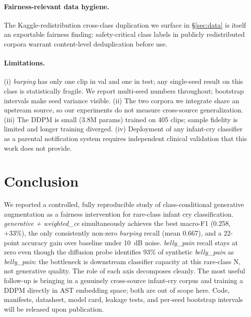 \documentclass[pmlr,twocolumn,10pt]{jmlr}
\begin{document}
\paragraph{Fairness-relevant data hygiene.} The Kaggle-redistribution cross-class duplication we surface in \S\ref{sec:data} is itself an exportable fairness finding: safety-critical class labels in publicly redistributed corpora warrant content-level deduplication before use.

\paragraph{Limitations.}
(i) \textit{burping} has only one clip in val and one in test; any single-seed result on this class is statistically fragile. We report multi-seed numbers throughout; bootstrap intervals make seed variance visible.
(ii) The two corpora we integrate share an upstream source, so our experiments do not measure cross-source generalization.
(iii) The DDPM is small (3.8M params) trained on 405 clips; sample fidelity is limited and longer training diverged.
(iv) Deployment of any infant-cry classifier as a parental notification system requires independent clinical validation that this work does not provide.

\section{Conclusion}\label{sec:concl}
We reported a controlled, fully reproducible study of class-conditional generative augmentation as a fairness intervention for rare-class infant cry classification. \textit{generative + weighted\_ce} simultaneously achieves the best macro-F1 (0.258, $+33\%$), the only consistently non-zero \textit{burping} recall (mean 0.667), and a 22-point accuracy gain over baseline under 10~dB noise. \textit{belly\_pain} recall stays at zero even though the diffusion probe identifies 93\% of synthetic \textit{belly\_pain} as \textit{belly\_pain}: the bottleneck is downstream classifier capacity at this rare-class N, not generative quality. The role of each axis decomposes cleanly. The most useful follow-up is bringing in a genuinely cross-source infant-cry corpus and training a DDPM directly in AST embedding space; both are out of scope here. Code, manifests, datasheet, model card, leakage tests, and per-seed bootstrap intervals will be released upon publication.


\end{document}
